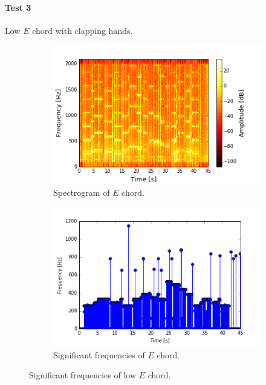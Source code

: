 \paragraph{Test 3} Low $E$ chord with clapping hands.
\begin{figure}[H]
\centering
\begin{subfigure}{0.49\textwidth}
\centering
\includegraphics[width=\textwidth]{figures/validation/systemtest/final_spec2.png}
\caption{Spectrogram of $E$ chord.}
\label{fig:final_spec2}
\end{subfigure}
\begin{subfigure}{0.49\textwidth}
\centering
\includegraphics[width=\textwidth]{figures/validation/systemtest/final_peak2.png}
\caption{Significant frequencies of $E$ chord.}
\label{fig:final_peak2}
\end{subfigure}
\caption{Significant frequencies of low $E$ chord.}
\label{fig:final_2}
\end{figure}

